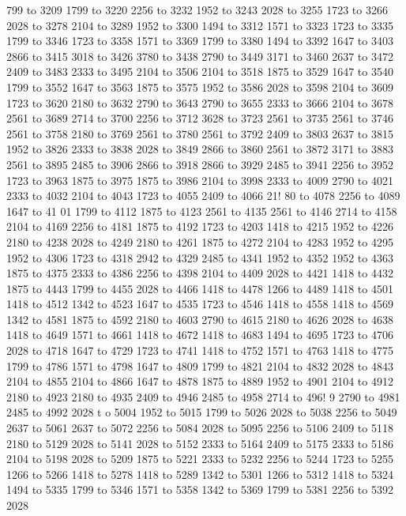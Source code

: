 799 to 3209 1799 to 3220 2256 to 3232 1952 to 3243 2028 to 3255 1723 to 3266 2028 to 3278 2104 to 3289 1952 to 3300 1494 to 3312 1571 to 3323 1723 to 3335 1799 to 3346 1723 to 3358 1571 to 3369 1799 to 3380 1494 to 3392 1647 to 3403 2866 to 3415 3018 to 3426 3780 to 3438 2790 to 3449 3171 to 3460 2637 to 3472 2409 to 3483 2333 to 3495 2104 to 3506 2104 to 3518 1875 to 3529 1647 to 3540 1799 to 3552 1647 to 3563 1875 to 3575 1952 to 3586 2028 to 3598 2104 to 3609 1723 to 3620 2180 to 3632 2790 to 3643 2790 to 3655 2333 to 3666 2104 to 3678 2561 to 3689 2714 to 3700 2256 to 3712 3628 to 3723 2561 to 3735 2561 to 3746 2561 to 3758 2180 to 3769 2561 to 3780 2561 to 3792 2409 to 3803 2637 to 3815 1952 to 3826 2333 to 3838 2028 to 3849 2866 to 3860 2561 to 3872 3171 to 3883 2561 to 3895 2485 to 3906 2866 to 3918 2866 to 3929 2485 to 3941 2256 to 3952 1723 to 3963 1875 to 3975 1875 to 3986 2104 to 3998 2333 to 4009 2790 to 4021 2333 to 4032 2104 to 4043 1723 to 4055 2409 to 4066 21!
80 to 4078 2256 to 4089 1647 to 41
01 1799 to 4112 1875 to 4123 2561 to 4135 2561 to 4146 2714 to 4158 2104 to 4169 2256 to 4181 1875 to 4192 1723 to 4203 1418 to 4215 1952 to 4226 2180 to 4238 2028 to 4249 2180 to 4261 1875 to 4272 2104 to 4283 1952 to 4295 1952 to 4306 1723 to 4318 2942 to 4329 2485 to 4341 1952 to 4352 1952 to 4363 1875 to 4375 2333 to 4386 2256 to 4398 2104 to 4409 2028 to 4421 1418 to 4432 1875 to 4443 1799 to 4455 2028 to 4466 1418 to 4478 1266 to 4489 1418 to 4501 1418 to 4512 1342 to 4523 1647 to 4535 1723 to 4546 1418 to 4558 1418 to 4569 1342 to 4581 1875 to 4592 2180 to 4603 2790 to 4615 2180 to 4626 2028 to 4638 1418 to 4649 1571 to 4661 1418 to 4672 1418 to 4683 1494 to 4695 1723 to 4706 2028 to 4718 1647 to 4729 1723 to 4741 1418 to 4752 1571 to 4763 1418 to 4775 1799 to 4786 1571 to 4798 1647 to 4809 1799 to 4821 2104 to 4832 2028 to 4843 2104 to 4855 2104 to 4866 1647 to 4878 1875 to 4889 1952 to 4901 2104 to 4912 2180 to 4923 2180 to 4935 2409 to 4946 2485 to 4958 2714 to 496!
9 2790 to 4981 2485 to 4992 2028 t
o 5004 1952 to 5015 1799 to 5026 2028 to 5038 2256 to 5049 2637 to 5061 2637 to 5072 2256 to 5084 2028 to 5095 2256 to 5106 2409 to 5118 2180 to 5129 2028 to 5141 2028 to 5152 2333 to 5164 2409 to 5175 2333 to 5186 2104 to 5198 2028 to 5209 1875 to 5221 2333 to 5232 2256 to 5244 1723 to 5255 1266 to 5266 1418 to 5278 1418 to 5289 1342 to 5301 1266 to 5312 1418 to 5324 1494 to 5335 1799 to 5346 1571 to 5358 1342 to 5369 1799 to 5381 2256 to 5392 2028
